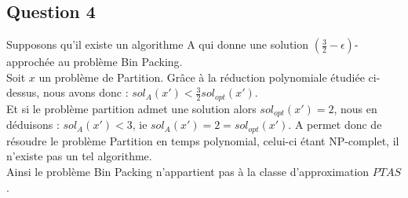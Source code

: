 \subsection{Question 4}\label{ex10_q5}
Supposons qu'il existe un algorithme A qui donne une solution $(\frac{3}{2} -
\epsilon)$-approchée au problème Bin Packing.\\
Soit $x$ un problème de Partition.
Grâce à la réduction polynomiale étudiée ci-dessus, nous avons donc :
$sol_{A}(x') < \frac{3}{2}sol_{opt}(x')$.\\
Et si le problème partition admet une solution alors $sol_{opt}(x') = 2$, nous en
déduisons : $sol_{A}(x') < 3$, ie $sol_A(x') = 2 = sol_{opt}(x')$.
A permet donc de résoudre le problème Partition en temps polynomial, celui-ci étant
NP-complet, il n'existe pas un tel algorithme.\\
Ainsi le problème Bin Packing n'appartient pas à la classe d'approximation $PTAS$.

